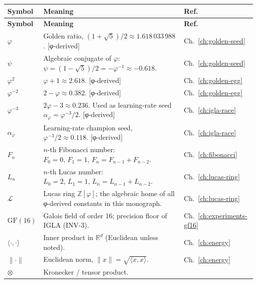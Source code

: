 \begin{longtable}{@{}p{3.2cm}p{9cm}p{2cm}@{}}
\toprule
\textbf{Symbol} & \textbf{Meaning} & \textbf{Ref.} \\
\midrule
\endfirsthead
\toprule
\textbf{Symbol} & \textbf{Meaning} & \textbf{Ref.} \\
\midrule
\endhead
\bottomrule
\endfoot
%
\(\varphi\)
  & Golden ratio, \((1+\sqrt{5})/2 \approx 1.618\,033\,988\).
    \textsf{[φ-derived]}
  & Ch.~\ref{ch:golden-seed} \\
\(\psi\)
  & Algebraic conjugate of \(\varphi\):
    \(\psi = (1-\sqrt{5})/2 = -\varphi^{-1} \approx -0.618\).
  & Ch.~\ref{ch:golden-seed} \\
\(\varphi^{2}\)
  & \(\varphi+1 \approx 2.618\). \textsf{[φ-derived]}
  & Ch.~\ref{ch:golden-egg} \\
\(\varphi^{-2}\)
  & \(2-\varphi \approx 0.382\). \textsf{[φ-derived]}
  & Ch.~\ref{ch:golden-egg} \\
\(\varphi^{-3}\)
  & \(2\varphi-3 \approx 0.236\). Used as learning-rate seed
    \(\alpha_{\varphi} = \varphi^{-3}/2\). \textsf{[φ-derived]}
  & Ch.~\ref{ch:igla-race} \\
\(\alpha_{\varphi}\)
  & Learning-rate champion seed, \(\varphi^{-3}/2 \approx 0.118\).
    \textsf{[φ-derived]}
  & Ch.~\ref{ch:igla-race} \\
%
\(F_{n}\)
  & \(n\)-th Fibonacci number: \(F_{0}=0,\,F_{1}=1,\,F_{n}=F_{n-1}+F_{n-2}\).
  & Ch.~\ref{ch:fibonacci} \\
\(L_{n}\)
  & \(n\)-th Lucas number: \(L_{0}=2,\,L_{1}=1,\,L_{n}=L_{n-1}+L_{n-2}\).
  & Ch.~\ref{ch:lucas-ring} \\
\(\mathcal{L}\)
  & Lucas ring \(\mathbb{Z}[\varphi]\); the algebraic home of all
    φ-derived constants in this monograph.
  & Ch.~\ref{ch:lucas-ring} \\
%
\(\mathrm{GF}(16)\)
  & Galois field of order 16; precision floor of IGLA (INV-3).
  & Ch.~\ref{ch:experiments-gf16} \\
\(\langle \cdot,\cdot \rangle\)
  & Inner product in \(\mathbb{R}^{d}\) (Euclidean unless noted).
  & Ch.~\ref{ch:energy} \\
\(\|\cdot\|\)
  & Euclidean norm, \(\|x\|=\sqrt{\langle x,x\rangle}\).
  & Ch.~\ref{ch:energy} \\
\(\otimes\)
  & Kronecker / tensor product.

\end{longtable}
